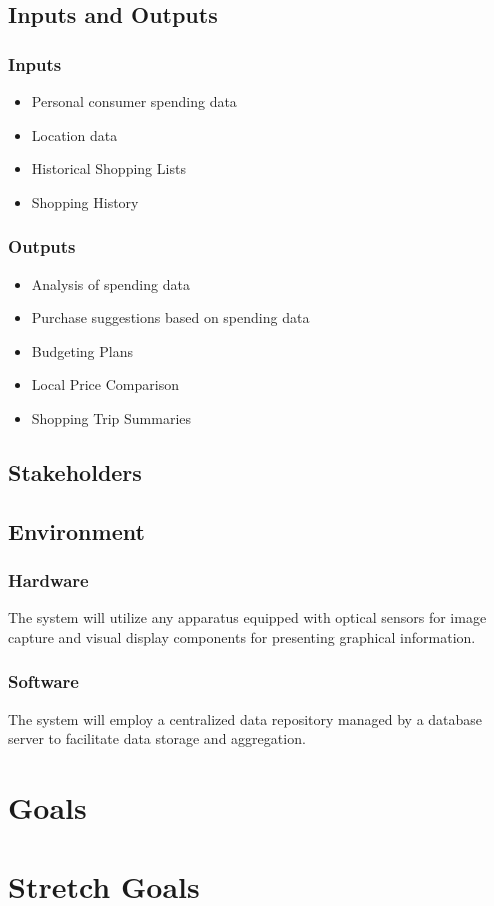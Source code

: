 \documentclass{article}
\begin{document}
\subsection{Inputs and Outputs}

\subsubsection{Inputs}
    \begin{itemize}
        \item Personal consumer spending data
        \item Location data
        \item Historical Shopping Lists
        \item Shopping History
    \end{itemize}

\subsubsection{Outputs}
    \begin{itemize}
        \item Analysis of spending data
        \item Purchase suggestions based on spending data
        \item Budgeting Plans
        \item Local Price Comparison
        \item Shopping Trip Summaries
    \end{itemize}

\subsection{Stakeholders}

\subsection{Environment}

\subsubsection{Hardware} 
The system will utilize any apparatus equipped with optical sensors for image capture and visual display components for presenting graphical information.
\subsubsection{Software}
The system will employ a centralized data repository managed by a database server to facilitate data storage and aggregation.

\section{Goals}

\section{Stretch Goals}
\end{document}
